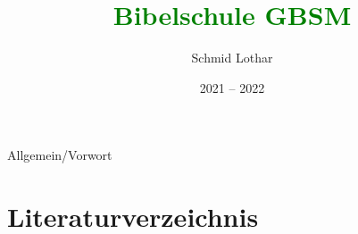 \documentclass{scrreprt}
\title{\textcolor{green}{Bibelschule GBSM}}
\author{Schmid Lothar}
\date{2021 -- 2022}
\begin{document}
\maketitle
\tableofcontents

\newpage

 {Allgemein/Vorwort}


\chapter{Literaturverzeichnis}

\end{document}
